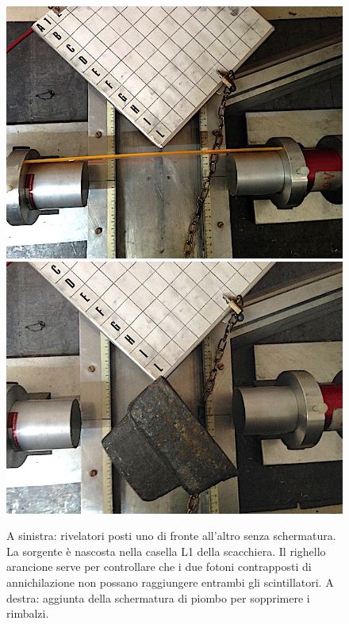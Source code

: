 \begin{figure}[h]
\centering
\subfloat
{\includegraphics[width=17 em]{immagini/alter} \label{spostati} }
\subfloat
{\includegraphics[width=17 em]{immagini/spostati2} \label{spostati2}}
\caption{
A sinistra:
rivelatori posti uno di fronte all'altro senza schermatura.
La sorgente è nascosta nella casella L1 della scacchiera.
Il righello arancione serve per controllare che i due fotoni contrapposti di annichilazione
non possano raggiungere entrambi gli scintillatori.
A destra: aggiunta della schermatura di piombo per sopprimere i rimbalzi.}
\end{figure}

